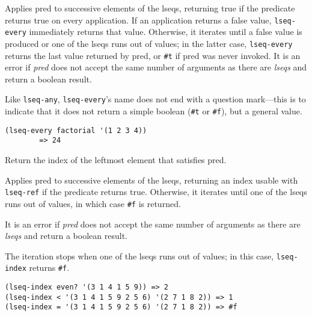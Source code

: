 \begin{entry}{%
  }

  Applies pred to successive elements of the lseqs, returning true if
  the predicate returns true on every application. If an application
  returns a false value, \texttt{lseq-every} immediately returns that
  value.  Otherwise, it iterates until a false value is produced or
  one of the lseqs runs out of values; in the latter case,
  \texttt{lseq-every} returns the last value returned by pred, or
  \texttt{\#t} if pred was never invoked. It is an error if
  \emph{pred} does not accept the same number of arguments as there
  are \emph{lseqs} and return a boolean result.

  Like \texttt{lseq-any}, \texttt{lseq-every}'s name does not end with
  a question mark---this is to indicate that it does not return a
  simple boolean (\texttt{\#t} or \texttt{\#f}), but a general value.

\begin{verbatim}
(lseq-every factorial '(1 2 3 4))
        => 24
\end{verbatim}
\end{entry}

\begin{entry}{%
  }

  Return the index of the leftmost element that satisfies pred.

  Applies pred to successive elements of the lseqs, returning an index
  usable with \texttt{lseq-ref} if the predicate returns
  true. Otherwise, it iterates until one of the lseqs runs out of
  values, in which case \texttt{\#f} is returned.

  It is an error if \emph{pred} does not accept the same number of
  arguments as there are \emph{lseqs} and return a boolean result.

  The iteration stops when one of the lseqs runs out of values; in
  this case, \texttt{lseq-index} returns \texttt{\#f}.

\begin{verbatim}
(lseq-index even? '(3 1 4 1 5 9)) => 2
(lseq-index < '(3 1 4 1 5 9 2 5 6) '(2 7 1 8 2)) => 1
(lseq-index = '(3 1 4 1 5 9 2 5 6) '(2 7 1 8 2)) => #f
\end{verbatim}
\end{entry}


